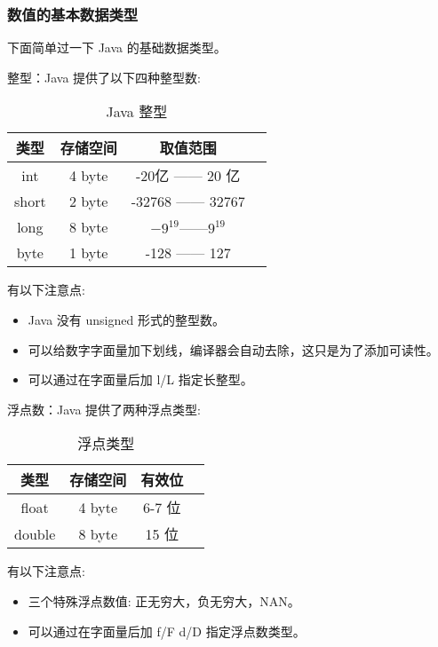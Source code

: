 \subsubsection{数值的基本数据类型}

下面简单过一下 Java 的基础数据类型。

\noindent 整型：Java 提供了以下四种整型数:

\begin{table}[H]
    \centering
    \caption{Java 整型}
    \label{table:Java 整型}
    \setlength{\tabcolsep}{10mm}
    \begin{tabular}{c|c|cc}
        \toprule
        \textbf{类型} & \textbf{存储空间} & \textbf{取值范围} \\
        \midrule
        int & 4 byte & -20亿 —— 20 亿 \\
        short & 2 byte & -32768 —— 32767 \\
        long & 8 byte & $-9^{19} \text{——} 9^{19}$ \\
        byte & 1 byte & -128 —— 127 \\
        \bottomrule
    \end{tabular}
\end{table}

有以下注意点:
\begin{itemize}
    \item Java 没有 unsigned 形式的整型数。
    \item 可以给数字字面量加下划线，编译器会自动去除，这只是为了添加可读性。
    \item 可以通过在字面量后加 l/L 指定长整型。
\end{itemize}

\noindent 浮点数：Java 提供了两种浮点类型:

\begin{table}[H]
    \centering
    \caption{浮点类型}
    \label{table:浮点类型}
    \setlength{\tabcolsep}{12mm}
    \begin{tabular}{c|c|cc}
        \toprule
        \textbf{类型} & \textbf{存储空间} & \textbf{有效位} \\
        \midrule
        float & 4 byte & 6-7 位 \\
        double & 8 byte & 15 位 \\
        \bottomrule
    \end{tabular}
\end{table}

有以下注意点:
\begin{itemize}
    \item 三个特殊浮点数值: 正无穷大，负无穷大，NAN。
    \item 可以通过在字面量后加 f/F d/D 指定浮点数类型。
\end{itemize}

